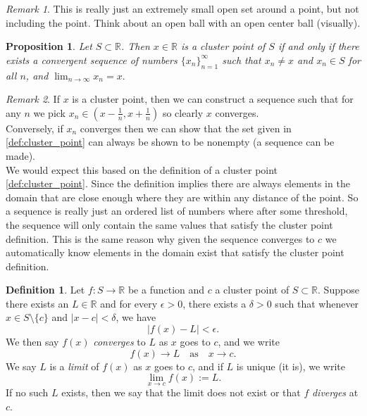 \documentclass{article}
\newtheorem{proposition}{Proposition}[section]
\theoremstyle{definition}
\newtheorem{definition}{Definition}[section]
\theoremstyle{remark}
\newtheorem{remark}{Remark}[section]
\begin{document}
\begin{remark}
This is really just an extremely small open set around a point, but not including the point. 
Think about an open ball with an open center ball (visually).
\end{remark}

\vspace{.5cm}
\begin{proposition}
Let $S \subset \mathbb{R}$. Then $x \in \mathbb{R}$ is a cluster point of $S$ if and only if there exists a convergent sequence of numbers $\{x_n\}_{n=1}^{\infty}$ such that $x_n \neq x$ and $x_n \in S$ for all $n$, and 
\(
\lim_{n\to\infty} x_n = x.
\)
\end{proposition}
\begin{remark}
If $x$ is a cluster point, then we can construct a sequence such that for any $n$ we pick $x_n \in (x- \frac{1}{n}, x+ \frac{1}{n})$ so clearly $x$ converges. \\
\indent Conversely, if $x_n$ converges then we can show that the set given in \ref{def:cluster_point} can always be shown to be nonempty (a sequence can be made).\\
\indent We would expect this based on the definition of a cluster point \ref{def:cluster_point}. Since the definition implies
there are always elements in the domain that are close enough where they are within any distance of the point. So 
a sequence is really just an ordered list of numbers where after some threshold, the sequence will only contain
the same values that satisfy the cluster point definition. This is the same reason why given the sequence converges to $c$ 
we automatically know elements in the domain exist that satisfy the cluster point definition.
\end{remark}


\vspace{.5cm}
\begin{definition}
Let $f : S \to \mathbb{R}$ be a function and $c$ a cluster point of $S \subset \mathbb{R}$. Suppose there exists an $L \in \mathbb{R}$ and for every $\epsilon > 0$, there exists a $\delta > 0$ such that whenever $x \in S \setminus \{c\}$ and $|x - c| < \delta$, we have
\[
|f(x) - L| < \epsilon.
\]
We then say $f(x)$ \textit{converges} to $L$ as $x$ goes to $c$, and we write
\[
f(x) \to L \quad \text{as} \quad x \to c.
\]
We say $L$ is a \textit{limit} of $f(x)$ as $x$ goes to $c$, and if $L$ is unique (it is), we write
\[
\lim_{x\to c} f(x) := L.
\]
If no such $L$ exists, then we say that the limit does not exist or that $f$ \textit{diverges} at $c$.

\end{definition}
\end{document}
